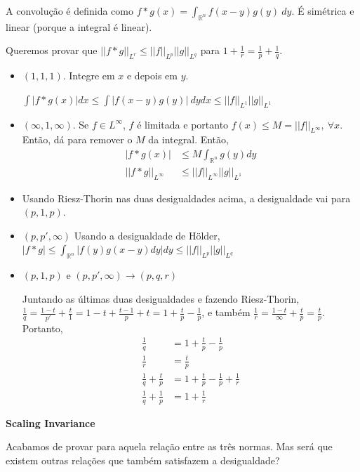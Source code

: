 \documentclass[11pt]{article}
\newcommand{\Rn}{{\mathbb{R}^n}}
\newcommand{\norm}[2]{\left|\left|#1\right|\right|_{L^{#2}}}
\begin{document}
A convolução é definida como \( f * g (x) = \int_\Rn f(x-y)g(y)\ dy \). É simétrica e linear (porque a integral é linear).

Queremos provar que \(\norm{f * g}{r} \leq \norm{f}{p} \norm{g}{q}\) para \( 1 + \frac{1}{r} = \frac{1}{p} + \frac{1}{q} \).

\begin{itemize}
	\item \((1,1,1)\). Integre em \( x \) e depois em \( y \).
	
	\( \int | f * g(x) | dx \leq \int |f(x-y)g(y)|\ dy dx \leq \norm{f}{1} \norm{g}{1}\) 
	
	\item \((\infty, 1, \infty)\). Se \( f \in L^\infty\), \( f \) é limitada e portanto \( f(x)\leq M = \norm{f}{\infty}, \ \forall x \). Então, dá para remover o \( M \) da integral. Então,\begin{align*} |f * g (x) | &\leq M \int_\Rn g(y) dy \\
		\norm{f * g}{\infty} &\leq \norm{f}{\infty} \norm{g}{1}
	\end{align*}

	\item Usando Riesz-Thorin nas duas desigualdades acima, a desigualdade vai para \( (p, 1, p) \).
	
	\item \((p, p', \infty)\) Usando a desigualdade de Hölder, \(| f * g | \leq \int_\Rn |f(y) g(x-y) dy|dy \leq \norm{f}{p} \norm{g}{q}\)
	
	\item \( (p, 1, p) \text{ e } (p, p', \infty) \rightarrow (p, q, r) \)
	
	Juntando as últimas duas desigualdades e fazendo Riesz-Thorin, \( \frac{1}{q} = \frac{1-t}{p'} + \frac{t}{1} = 1-t + \frac{t-1}{p} + t = 1 + \frac{t}{p} - \frac{1}{p}\), e também \( \frac{1}{r} = \frac{1-t}{\infty} + \frac{t}{p} = \frac{t}{p} \). Portanto,
	\begin{align*}
		\frac{1}{q} &= 1 + \frac{t}{p} - \frac{1}{p} \\
		\frac{1}{r} &= \frac{t}{p} \\
		\frac{1}{q} + \frac{t}{p} &= 1 + \frac{t}{p} - \frac{1}{p} + \frac{1}{r} \\
		\frac{1}{q} + \frac{1}{p} &= 1 + \frac{1}{r}
	\end{align*}	
\end{itemize}

\textbf{Scaling Invariance}

Acabamos de provar para aquela relação entre as três normas. Mas será que existem outras relações que também satisfazem a desigualdade? 
\end{document}

